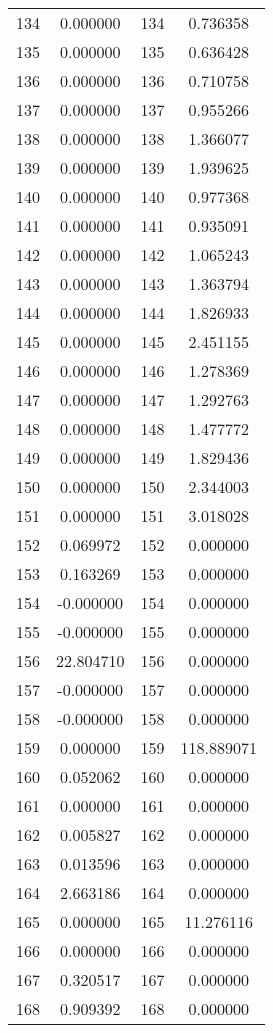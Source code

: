 \documentclass[12pt]{article}
\begin{document}
\begin{longtable}{@{}cccc@{}}
134 & 0.000000 & 134 & 0.736358 \\
135 & 0.000000 & 135 & 0.636428 \\
136 & 0.000000 & 136 & 0.710758 \\
137 & 0.000000 & 137 & 0.955266 \\
138 & 0.000000 & 138 & 1.366077 \\
139 & 0.000000 & 139 & 1.939625 \\
140 & 0.000000 & 140 & 0.977368 \\
141 & 0.000000 & 141 & 0.935091 \\
142 & 0.000000 & 142 & 1.065243 \\
143 & 0.000000 & 143 & 1.363794 \\
144 & 0.000000 & 144 & 1.826933 \\
145 & 0.000000 & 145 & 2.451155 \\
146 & 0.000000 & 146 & 1.278369 \\
147 & 0.000000 & 147 & 1.292763 \\
148 & 0.000000 & 148 & 1.477772 \\
149 & 0.000000 & 149 & 1.829436 \\
150 & 0.000000 & 150 & 2.344003 \\
151 & 0.000000 & 151 & 3.018028 \\
152 & 0.069972 & 152 & 0.000000 \\
153 & 0.163269 & 153 & 0.000000 \\
154 & -0.000000 & 154 & 0.000000 \\
155 & -0.000000 & 155 & 0.000000 \\
156 & 22.804710 & 156 & 0.000000 \\
157 & -0.000000 & 157 & 0.000000 \\
158 & -0.000000 & 158 & 0.000000 \\
159 & 0.000000 & 159 & 118.889071 \\
160 & 0.052062 & 160 & 0.000000 \\
161 & 0.000000 & 161 & 0.000000 \\
162 & 0.005827 & 162 & 0.000000 \\
163 & 0.013596 & 163 & 0.000000 \\
164 & 2.663186 & 164 & 0.000000 \\
165 & 0.000000 & 165 & 11.276116 \\
166 & 0.000000 & 166 & 0.000000 \\
167 & 0.320517 & 167 & 0.000000 \\
168 & 0.909392 & 168 & 0.000000 \\

\end{longtable}
\end{document}
